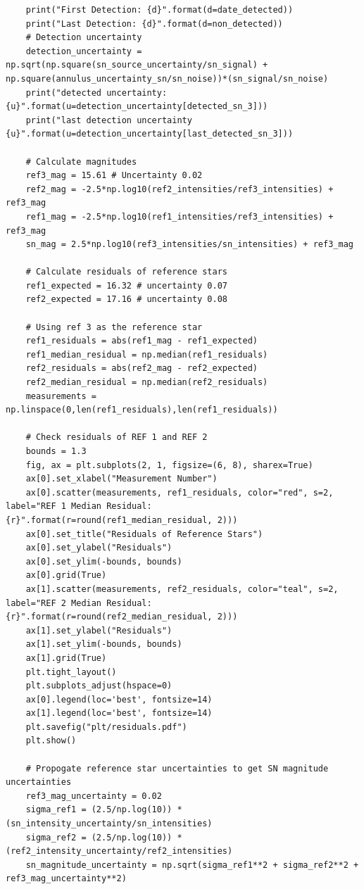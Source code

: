 \documentclass{article}
\begin{document}
\begin{appendices}
\begin{verbatim}
    print("First Detection: {d}".format(d=date_detected))
    print("Last Detection: {d}".format(d=non_detected))
    # Detection uncertainty
    detection_uncertainty = np.sqrt(np.square(sn_source_uncertainty/sn_signal) + np.square(annulus_uncertainty_sn/sn_noise))*(sn_signal/sn_noise)
    print("detected uncertainty: {u}".format(u=detection_uncertainty[detected_sn_3]))
    print("last detection uncertainty {u}".format(u=detection_uncertainty[last_detected_sn_3]))
    
    # Calculate magnitudes
    ref3_mag = 15.61 # Uncertainty 0.02
    ref2_mag = -2.5*np.log10(ref2_intensities/ref3_intensities) + ref3_mag
    ref1_mag = -2.5*np.log10(ref1_intensities/ref3_intensities) + ref3_mag
    sn_mag = 2.5*np.log10(ref3_intensities/sn_intensities) + ref3_mag
    
    # Calculate residuals of reference stars
    ref1_expected = 16.32 # uncertainty 0.07
    ref2_expected = 17.16 # uncertainty 0.08
    
    # Using ref 3 as the reference star
    ref1_residuals = abs(ref1_mag - ref1_expected)
    ref1_median_residual = np.median(ref1_residuals)
    ref2_residuals = abs(ref2_mag - ref2_expected)
    ref2_median_residual = np.median(ref2_residuals)
    measurements = np.linspace(0,len(ref1_residuals),len(ref1_residuals))
    
    # Check residuals of REF 1 and REF 2
    bounds = 1.3
    fig, ax = plt.subplots(2, 1, figsize=(6, 8), sharex=True)
    ax[0].set_xlabel("Measurement Number")
    ax[0].scatter(measurements, ref1_residuals, color="red", s=2, label="REF 1 Median Residual: {r}".format(r=round(ref1_median_residual, 2)))
    ax[0].set_title("Residuals of Reference Stars")
    ax[0].set_ylabel("Residuals")
    ax[0].set_ylim(-bounds, bounds)
    ax[0].grid(True)
    ax[1].scatter(measurements, ref2_residuals, color="teal", s=2, label="REF 2 Median Residual: {r}".format(r=round(ref2_median_residual, 2)))
    ax[1].set_ylabel("Residuals")
    ax[1].set_ylim(-bounds, bounds)
    ax[1].grid(True)
    plt.tight_layout()
    plt.subplots_adjust(hspace=0)
    ax[0].legend(loc='best', fontsize=14)
    ax[1].legend(loc='best', fontsize=14)
    plt.savefig("plt/residuals.pdf")
    plt.show()
    
    # Propogate reference star uncertainties to get SN magnitude uncertainties
    ref3_mag_uncertainty = 0.02
    sigma_ref1 = (2.5/np.log(10)) * (sn_intensity_uncertainty/sn_intensities)
    sigma_ref2 = (2.5/np.log(10)) * (ref2_intensity_uncertainty/ref2_intensities)
    sn_magnitude_uncertainty = np.sqrt(sigma_ref1**2 + sigma_ref2**2 + ref3_mag_uncertainty**2)
    

\end{verbatim}
\end{appendices}
\end{document}
